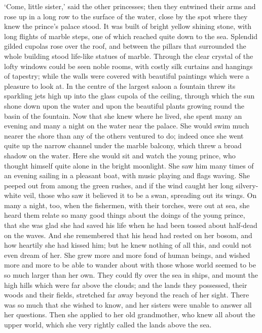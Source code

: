 `Come, little sister,' said the other princesses; then they
entwined their arms and rose up in a long row to the surface of the
water, close by the spot where they knew the prince's palace stood. 
It
was built of bright yellow shining stone, with long flights of
marble steps, one of which reached quite down to the sea. 
Splendid
gilded cupolas rose over the roof, and between the pillars that
surrounded the whole building stood life-like statues of marble.
Through the clear crystal of the lofty windows could be seen noble
rooms, with costly silk curtains and hangings of tapestry; while the
walls were covered with beautiful paintings which were a pleasure to
look at. 
In the centre of the largest saloon a fountain threw its
sparkling jets high up into the glass cupola of the ceiling, through
which the sun shone down upon the water and upon the beautiful
plants growing round the basin of the fountain. 
Now that she knew
where he lived, she spent many an evening and many a night on the
water near the palace. 
She would swim much nearer the shore than any
of the others ventured to do; indeed once she went quite up the narrow
channel under the marble balcony, which threw a broad shadow on the
water. 
Here she would sit and watch the young prince, who thought
himself quite alone in the bright moonlight. 
She saw him many times of
an evening sailing in a pleasant boat, with music playing and flags
waving. 
She peeped out from among the green rushes, and if the wind
caught her long silvery-white veil, those who saw it believed it to be
a swan, spreading out its wings. 
On many a night, too, when the
fishermen, with their torches, were out at sea, she heard them
relate so many good things about the doings of the young prince,
that she was glad she had saved his life when he had been tossed about
half-dead on the waves. 
And she remembered that his head had rested on
her bosom, and how heartily she had kissed him; but he knew nothing of
all this, and could not even dream of her. 
She grew more and more fond
of human beings, and wished more and more to be able to wander about
with those whose world seemed to be so much larger than her own.
They could fly over the sea in ships, and mount the high hills which
were far above the clouds; and the lands they possessed, their woods
and their fields, stretched far away beyond the reach of her sight.
There was so much that she wished to know, and her sisters were unable
to answer all her questions. 
Then she applied to her old
grandmother, who knew all about the upper world, which she very
rightly called the lands above the sea.

